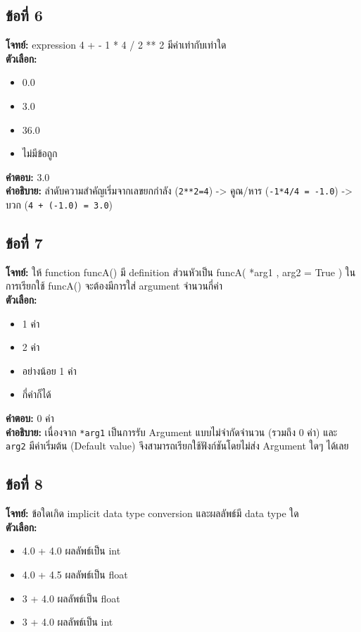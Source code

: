 \documentclass[12pt]{article}
\begin{document}
\subsection*{ข้อที่ 6}
\textbf{โจทย์:} expression 4 + - 1 * 4 / 2 ** 2 มีค่าเท่ากับเท่าใด\\
\textbf{ตัวเลือก:}
\begin{itemize}
    \item 0.0
    \item 3.0
    \item 36.0
    \item ไม่มีข้อถูก
\end{itemize}

\textbf{คำตอบ:} 3.0\\
\textbf{คำอธิบาย:} ลำดับความสำคัญเริ่มจากเลขยกกำลัง (\texttt{2**2=4}) -> คูณ/หาร (\texttt{-1*4/4 = -1.0}) -> บวก (\texttt{4 + (-1.0) = 3.0})

\subsection*{ข้อที่ 7}
\textbf{โจทย์:} ให้ function funcA() มี definition ส่วนหัวเป็น funcA( *arg1 , arg2 = True ) ในการเรียกใช้ funcA() จะต้องมีการใส่ argument จำนวนกี่ค่า\\
\textbf{ตัวเลือก:}
\begin{itemize}
    \item 1 ค่า
    \item 2 ค่า
    \item อย่างน้อย 1 ค่า
    \item กี่ค่าก็ได้
\end{itemize}

\textbf{คำตอบ:} 0 ค่า\\
\textbf{คำอธิบาย:} เนื่องจาก \texttt{*arg1} เป็นการรับ Argument แบบไม่จำกัดจำนวน (รวมถึง 0 ค่า) และ \texttt{arg2} มีค่าเริ่มต้น (Default value) จึงสามารถเรียกใช้ฟังก์ชันโดยไม่ส่ง Argument ใดๆ ได้เลย

\subsection*{ข้อที่ 8}
\textbf{โจทย์:} ข้อใดเกิด implicit data type conversion และผลลัพธ์มี data type ใด\\
\textbf{ตัวเลือก:}
\begin{itemize}
    \item 4.0 + 4.0 ผลลัพธ์เป็น int
    \item 4.0 + 4.5 ผลลัพธ์เป็น float
    \item 3 + 4.0 ผลลัพธ์เป็น float
    \item 3 + 4.0 ผลลัพธ์เป็น int
\end{itemize}
\end{document}
